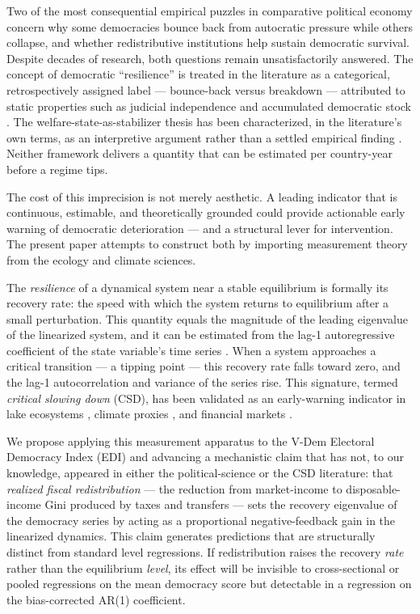 \documentclass[11pt,letterpaper]{article}
\begin{document}
Two of the most consequential empirical puzzles in comparative political economy concern why some democracies bounce back
from autocratic pressure while others collapse, and whether redistributive institutions help sustain democratic survival.
Despite decades of research, both questions remain unsatisfactorily answered. The concept of democratic ``resilience'' is
treated in the literature as a categorical, retrospectively assigned label --- bounce-back versus breakdown --- attributed
to static properties such as judicial independence and accumulated democratic stock \citep{Boese2021}. The
welfare-state-as-stabilizer thesis has been characterized, in the literature's own terms, as an interpretive argument
rather than a settled empirical finding \citep{Kumlin2014}. Neither framework delivers a quantity that can be estimated
per country-year before a regime tips.

The cost of this imprecision is not merely aesthetic. A leading indicator that is continuous, estimable, and theoretically
grounded could provide actionable early warning of democratic deterioration --- and a structural lever for intervention.
The present paper attempts to construct both by importing measurement theory from the ecology and climate sciences.

The \emph{resilience} of a dynamical system near a stable equilibrium is formally its recovery rate: the speed with which
the system returns to equilibrium after a small perturbation. This quantity equals the magnitude of the leading eigenvalue
of the linearized system, and it can be estimated from the lag-1 autoregressive coefficient of the state variable's time
series \citep{Scheffer2009,Scheffer2012}. When a system approaches a critical transition --- a tipping point --- this
recovery rate falls toward zero, and the lag-1 autocorrelation and variance of the series rise. This signature, termed
\emph{critical slowing down} (CSD), has been validated as an early-warning indicator in lake ecosystems
\citep{Carpenter2011}, climate proxies \citep{Dakos2008}, and financial markets \citep{Guttal2016}.

We propose applying this measurement apparatus to the V-Dem Electoral Democracy Index (EDI) and advancing a mechanistic
claim that has not, to our knowledge, appeared in either the political-science or the CSD literature: that \emph{realized
fiscal redistribution} --- the reduction from market-income to disposable-income Gini produced by taxes and transfers ---
sets the recovery eigenvalue of the democracy series by acting as a proportional negative-feedback gain in the linearized
dynamics. This claim generates predictions that are structurally distinct from standard level regressions. If
redistribution raises the recovery \emph{rate} rather than the equilibrium \emph{level}, its effect will be invisible to
cross-sectional or pooled regressions on the mean democracy score but detectable in a regression on the bias-corrected
AR(1) coefficient.
\end{document}
